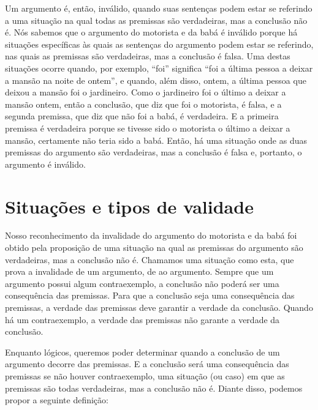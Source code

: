 Um argumento é, então, inválido, quando suas sentenças podem estar se referindo a uma situação na qual todas as premissas são verdadeiras, mas a conclusão não é.
Nós sabemos que o argumento do motorista e da babá é inválido porque há situações específicas às quais as sentenças do argumento podem estar se referindo, nas quais as premissas são verdadeiras, mas a conclusão é falsa.
Uma destas situações ocorre quando, por exemplo, ``foi'' significa ``foi a última pessoa a deixar a mansão na noite de ontem'', e quando, além disso, ontem, a última pessoa que deixou a mansão foi o jardineiro.
Como o jardineiro foi o último a deixar a mansão ontem, então a conclusão, que diz que foi o motorista, é falsa, e a segunda premissa, que diz que não foi a babá, é verdadeira.
E a primeira premissa é verdadeira porque se tivesse sido o motorista o último a deixar a mansão, certamente não teria sido a babá.
Então, há uma situação onde as duas premissas do argumento são verdadeiras, mas a conclusão é falsa e, portanto, o argumento é inválido.


\section{Situações e tipos de validade}
\label{ss:Validade}

Nosso reconhecimento da invalidade do argumento do motorista e da babá foi obtido pela proposição de uma situação na qual as premissas do argumento são verdadeiras, mas a conclusão não é.
Chamamos uma situação como esta, que prova a invalidade de um argumento, de  ao argumento.
Sempre que um argumento possui algum contraexemplo, a conclusão não poderá ser uma consequência das premissas.
Para que a conclusão seja uma consequência das premissas, a verdade das premissas deve garantir a verdade da conclusão. Quando há um contraexemplo, a verdade das premissas não garante a verdade da conclusão.

Enquanto lógicos, queremos poder determinar quando a conclusão de um argumento decorre das premissas.
E a conclusão será uma consequência das premissas se não houver contraexemplo, uma situação (ou caso) em que as premissas são todas verdadeiras, mas a conclusão não é.
Diante disso, podemos propor a seguinte definição:


